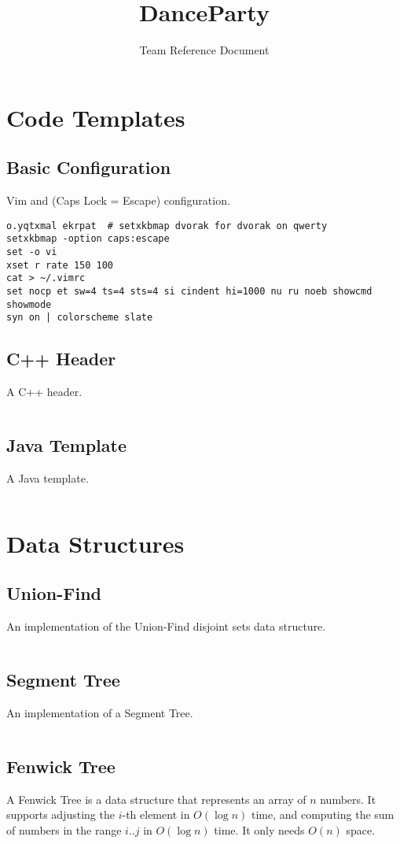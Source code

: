 \documentclass[9pt,a4paper,twocolumn,landscape,oneside]{amsart}
\title{DanceParty}
\subtitle{Team Reference Document}
\newcommand{\code}[1]{\inputminted{cpp}{_code/#1}}
\begin{document}
\maketitle
\thispagestyle{fancy}
\tableofcontents
\newpage

\section{Code Templates}
    \subsection{Basic Configuration}
        Vim and (Caps Lock = Escape) configuration.
        \begin{verbatim}
o.yqtxmal ekrpat  # setxkbmap dvorak for dvorak on qwerty
setxkbmap -option caps:escape
set -o vi
xset r rate 150 100
cat > ~/.vimrc
set nocp et sw=4 ts=4 sts=4 si cindent hi=1000 nu ru noeb showcmd showmode
syn on | colorscheme slate
        \end{verbatim}

    \subsection{C++ Header}
        A C++ header.
        \code{header.cpp}

    \subsection{Java Template}
        A Java template.
        \code{template.java}


\section{Data Structures}

    \subsection{Union-Find}
        An implementation of the Union-Find disjoint sets data structure.
        \code{data-structures/union_find.cpp}

    \subsection{Segment Tree}
        An implementation of a Segment Tree.
        \code{data-structures/segment_tree.cpp}

    \subsection{Fenwick Tree}
        A Fenwick Tree is a data structure that represents an array of $n$
        numbers. It supports adjusting the $i$-th element in $O(\log n)$ time,
        and computing the sum of numbers in the range $i..j$ in $O(\log n)$
        time. It only needs $O(n)$ space.
        \code{data-structures/fenwick_tree.cpp}
\end{document}
